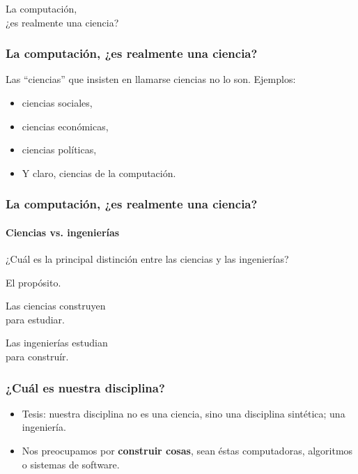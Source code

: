 \documentclass[spanish]{beamer}
\begin{document}
\begin{frame}
  \begin{center}
    \Huge{
      La computación,\\
      ¿es realmente una ciencia?
    }
  \end{center}
\end{frame}

\begin{frame}
  \frametitle{La computación, ¿es realmente una ciencia?}

  Las ``ciencias'' que insisten en llamarse ciencias no lo son.
  \pause
  Ejemplos:
  \pause

  \begin{itemize}
    \item ciencias sociales, \pause
    \item ciencias económicas, \pause
    \item ciencias políticas, \pause
    \item Y claro, ciencias de la computación.
  \end{itemize}
\end{frame}

\begin{frame}
  \frametitle{La computación, ¿es realmente una ciencia?}
  \framesubtitle{Ciencias vs. ingenierías}

  \pause

  ¿Cuál es la principal distinción entre las ciencias y las ingenierías?

  \pause

  \vspace{2em}
  El propósito.
\end{frame}

\begin{frame}
  \begin{center}
    \Huge{
      Las ciencias construyen \\
      para estudiar.

      \vspace{2em}

      Las ingenierías estudian \\
      para construír.
    }
  \end{center}
\end{frame}

\begin{frame}
  \frametitle{¿Cuál es nuestra disciplina?}

  \pause

  \begin{itemize}
    \item Tesis: nuestra disciplina no es una ciencia, sino una disciplina
      sintética; una ingeniería.
    \pause

    \item Nos preocupamos por \textbf{construir cosas}, sean éstas
      computadoras, algoritmos o sistemas de software.
  \end{itemize}
\end{frame}
\end{document}
